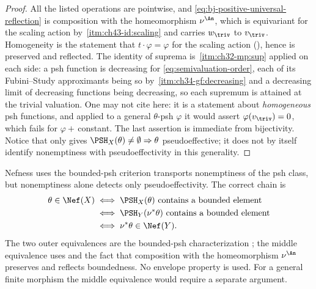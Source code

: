 \begin{proof}
All the listed operations are pointwise, and
\eqref{eq:bj-positive-universal-reflection} is composition with the
homeomorphism $\nu^{\An}$, which is equivariant for the scaling action by
\,\cref{itm:ch43-id:scaling} and
carries $w_\triv$ to $v_\triv$.  Homogeneity is the statement that
$t\cdot\varphi=\varphi$ for the scaling action
(), hence is preserved and reflected.  The
identity of suprema is \,\cref{itm:ch32-mp:sup}
applied on each side: a psh function is decreasing for
\eqref{eq:semivaluation-order}, each of its Fubini--Study approximants being
so by
\,\cref{itm:ch34-gf:decreasing} and a
decreasing limit of decreasing functions being decreasing, so each supremum
is attained at the trivial valuation.  One may not cite
 here: it is a statement about
\emph{homogeneous} psh functions, and applied to a general $\theta$-psh
$\varphi$ it would assert $\varphi(v_{\triv})=0$, which fails for
$\varphi+$\,constant.  The last assertion is immediate from
bijectivity.  Notice that  only gives
$\PSH_X(\theta)\ne\emptyset\Rightarrow\theta$ pseudoeffective; it does
not by itself identify nonemptiness with pseudoeffectivity in this
generality.
\end{proof}

\begin{warning}{Nefness uses the bounded-psh criterion}
\label{warn:ch43-nef-not-transported}
 transports nonemptiness of the psh
class, but nonemptiness alone detects only pseudoeffectivity.  The correct
chain is
\[
\begin{aligned}
 \theta\in\Nef(X)
 &\iff \PSH_X(\theta)\text{ contains a bounded element}\\
 &\iff \PSH_Y(\nu^*\theta)\text{ contains a bounded element}\\
 &\iff \nu^*\theta\in\Nef(Y).
\end{aligned}
\]
The two outer equivalences are the bounded-psh characterization
; the middle equivalence uses
 and the fact that composition
with the homeomorphism $\nu^{\An}$ preserves and reflects boundedness.
No envelope property is used.  For a general finite morphism the middle
equivalence would require a separate argument.
\end{warning}

